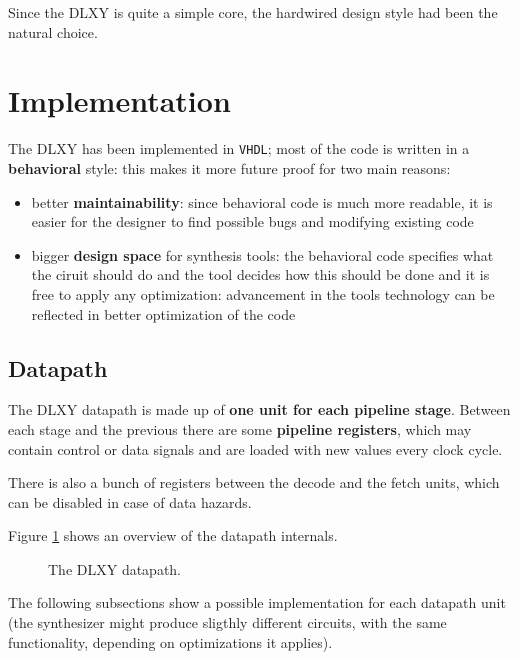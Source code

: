 \bigskip
Since the DLXY is quite a simple core, the hardwired design style had been the
natural choice.

\section{Implementation}
The DLXY has been implemented in \texttt{VHDL}; most of the code is written in a
\textbf{behavioral} style: this makes it more future proof for two main reasons:
\begin{itemize}
	\item better \textbf{maintainability}: since behavioral code is much
		more readable, it is easier for the designer to find possible
		bugs and modifying existing code
	\item bigger \textbf{design space} for synthesis tools: the behavioral
		code specifies what the ciruit should do and the tool decides
		how this should be done and it is free to apply any optimization:
		advancement in the tools technology can be reflected in better
		optimization of the code
\end{itemize}

\subsection{Datapath}
The DLXY datapath is made up of \textbf{one unit for each pipeline stage}.
Between each stage and the previous there are some \textbf{pipeline registers},
which may contain control or data signals and are loaded with new values every
clock cycle.

There is also a bunch of registers between the decode and the fetch units, which
can be disabled in case of data hazards.

\bigskip
Figure \ref{fig:datapath} shows an overview of the datapath internals.

\begin{figure}[H]
	\centering
	\caption{The DLXY datapath.}
	\label{fig:datapath}
\end{figure}

\bigskip
The following subsections show a possible implementation for each datapath unit
(the synthesizer might produce sligthly different circuits, with the same
functionality, depending on optimizations it applies).

